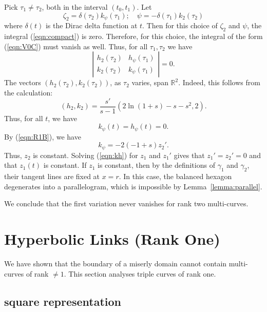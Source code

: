 \documentclass[11pt]{amsart}
\newcommand{\ring}[1]{\mathbb{#1}}
\begin{document}
Pick $\tau_1\ne\tau_2$, both in the interval $(t_0,t_1)$.
Let $$\zeta_2 = \delta(\tau_2) k_\psi(\tau_1);\quad \psi= - \delta(\tau_1)k_2(\tau_2)$$
where $\delta(t)$ is the Dirac delta function at $t$.  Then for this choice of
$\zeta_2$ and $\psi$, the integral (\ref{eqn:compact}) is zero.  Therefore, for
this choice, the integral of the form (\ref{eqn:V0C}) must vanish as well.  Thus, for
all $\tau_1,\tau_2$ we have
$$
   \left|\begin{array}{ccc} h_2(\tau_2) & h_\psi(\tau_1) \\k_2(\tau_2) & k_\psi(\tau_1) 
   \end{array}\right| = 0.
$$
The vectors $(h_2(\tau_2),k_2(\tau_2))$, as $\tau_2$ varies, span $\ring{R}^2$. Indeed, this follows from the calculation:
$$
(h_2,k_2)= \frac {s'}{s-1} (2\ln(1+s) - s - s^2,2).
$$ 
Thus,
for all $t$, we have
   \begin{equation}\label{eqn:kh}
     k_\psi(t) = h_\psi(t) = 0.
   \end{equation}
By (\ref{eqn:R1B}), we have 
$$
  k_\psi %
  = -2 (-1+s) z_2'.
$$
Thus, $z_2$ is constant.  Solving (\ref{eqn:kh}) for $z_1$ and $z_1'$ gives
that $z_1'=z_2'=0$ and
that $z_1(t)$
is constant.  If $z_1$ is constant, then
by the definitions of $\gamma_1$ and $\gamma_2$,
their tangent lines are fixed at $x=r$.  In this case, the balanced hexagon degenerates into a parallelogram, which is impossible by Lemma~\ref{lemma:parallel}.

We conclude that the first variation never vanishes for rank two multi-curves.


\section{Hyperbolic Links (Rank One)}

We have shown that the boundary of a miserly domain cannot
contain multi-curves of rank $\ne 1$.  This section analyses triple
curves of rank one.


\subsection{square representation}
\end{document}
